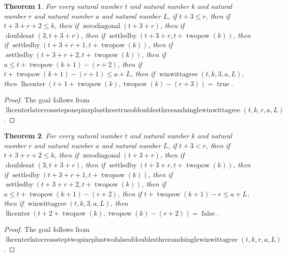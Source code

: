 \documentclass[11pt]{article}
\newtheorem{theorem}{Theorem}[section]
\theoremstyle{definition}
\begin{document}
\begin{theorem}
\label{ll:paper:lhcenter-late-cross-step-one-pin-r-plus-three-true-of-doubles-three-and-single-winwittagree}
For every natural number \(t\) and natural number \(k\) and natural number \(r\) and natural number \(a\) and natural number \(L\), if \(t + 3 \le r\), then if \(t + 3 + r + 2 \le k\), then if \(\operatorname{zerodiagonal}(t + 3 + r)\), then if \(\operatorname{doublesat}(3, t + 3 + r)\), then if \(\operatorname{settledby}(t + 3 + r, t + \operatorname{twopow}(k))\), then if \(\operatorname{settledby}(t + 3 + r + 1, t + \operatorname{twopow}(k))\), then if \(\operatorname{settledby}(t + 3 + r + 2, t + \operatorname{twopow}(k))\), then if \(a \le t + \operatorname{twopow}(k + 1) - (r + 2)\), then if \(t + \operatorname{twopow}(k + 1) - (r + 1) \le a + L\), then if \(\operatorname{winwittagree}(t, k, 3, a, L)\), then \(\operatorname{lhcenter}(t + 1 + \operatorname{twopow}(k), \operatorname{twopow}(k) - (r + 3)) = \operatorname{true}\).
\end{theorem}
\begin{proof}
The goal follows from \(\operatorname{lhcenterlatecrosssteponepinrplusthreetrueofdoublesthreeandsinglewinwittagree}(t, k, r, a, L)\).
\end{proof}
\begin{theorem}
\label{ll:paper:lhcenter-late-cross-step-two-pin-r-plus-two-false-of-doubles-three-and-single-winwittagree}
For every natural number \(t\) and natural number \(k\) and natural number \(r\) and natural number \(a\) and natural number \(L\), if \(t + 3 < r\), then if \(t + 3 + r + 2 \le k\), then if \(\operatorname{zerodiagonal}(t + 3 + r)\), then if \(\operatorname{doublesat}(3, t + 3 + r)\), then if \(\operatorname{settledby}(t + 3 + r, t + \operatorname{twopow}(k))\), then if \(\operatorname{settledby}(t + 3 + r + 1, t + \operatorname{twopow}(k))\), then if \(\operatorname{settledby}(t + 3 + r + 2, t + \operatorname{twopow}(k))\), then if \(a \le t + \operatorname{twopow}(k + 1) - (r + 2)\), then if \(t + \operatorname{twopow}(k + 1) - r \le a + L\), then if \(\operatorname{winwittagree}(t, k, 3, a, L)\), then \(\operatorname{lhcenter}(t + 2 + \operatorname{twopow}(k), \operatorname{twopow}(k) - (r + 2)) = \operatorname{false}\).
\end{theorem}
\begin{proof}
The goal follows from \(\operatorname{lhcenterlatecrosssteptwopinrplustwofalseofdoublesthreeandsinglewinwittagree}(t, k, r, a, L)\).
\end{proof}
\end{document}
